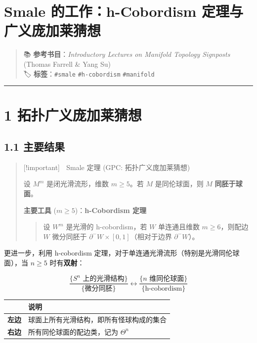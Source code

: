 \documentclass[
  letterpaper,
  DIV=11,
  numbers=noendperiod]{scrartcl}
\author{}
\date{}
\begin{document}
\section{Smale 的工作：h-Cobordism
定理与广义庞加莱猜想}\label{smale-ux7684ux5de5ux4f5ch-cobordism-ux5b9aux7406ux4e0eux5e7fux4e49ux5e9eux52a0ux83b1ux731cux60f3}

\begin{quote}
📚 \textbf{参考书目}：\emph{Introductory Lectures on Manifold Topology
Signposts} (Thomas Farrell \& Yang Su)\\
🏷️ \textbf{标签}：\texttt{\#smale} \texttt{\#h-cobordism}
\texttt{\#manifold}
\end{quote}

\begin{center}\rule{0.5\linewidth}{0.5pt}\end{center}

\section{1
拓扑广义庞加莱猜想}\label{ux62d3ux6251ux5e7fux4e49ux5e9eux52a0ux83b1ux731cux60f3}

\subsection{1.1 主要结果}\label{ux4e3bux8981ux7ed3ux679c}

\begin{quote}
{[}!important{]} 🎯 Smale 定理 (GPC: 拓扑广义庞加莱猜想)

设 \(M^m\) 是闭光滑流形，维数 \(m \geq 5\)。若 \(M\) 是同伦球面，则
\(M\) \textbf{同胚于球面}。

\textbf{主要工具} (\(m \geq 5\))：\textbf{h-Cobordism 定理}

\begin{quote}
设 \(W^m\) 是光滑的 h-cobordism，若 \(W\) 单连通且维数
\(m \geq 6\)，则配边 \(W\) 微分同胚于
\(\partial^- W \times [0,1]\)（相对于边界 \(\partial^- W\)）。
\end{quote}
\end{quote}

更进一步，利用 h-cobordism
定理，对于单连通光滑流形（特别是光滑同伦球面），当 \(n \geq 5\)
时有\textbf{双射}：

\[\boxed{\frac{\{S^n \text{ 上的光滑结构}\}}{\{微分同胚\}} \longleftrightarrow \frac{\{n \text{ 维同伦球面}\}}{\{\text{h-cobordism}\}}}\]

\begin{longtable}[]{@{}cl@{}}
\toprule\noalign{}
& 说明 \\
\midrule\noalign{}
\endhead
\bottomrule\noalign{}
\endlastfoot
\textbf{左边} & 球面上所有光滑结构，即所有怪球构成的集合 \\
\textbf{右边} & 所有同伦球面的配边类，记为 \(\Theta^n\) \\
\end{longtable}
\end{document}
